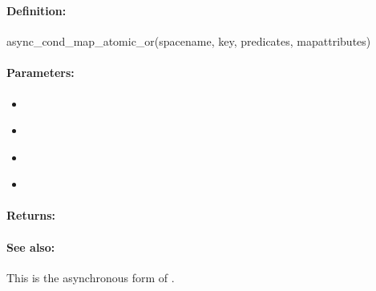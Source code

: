 \pagebreak
\subsubsection{}
\label{api:ruby:async_cond_map_atomic_or}


\paragraph{Definition:}
\begin{rubycode}
async_cond_map_atomic_or(spacename, key, predicates, mapattributes)
\end{rubycode}

\paragraph{Parameters:}
\begin{itemize}[noitemsep]
\item {}\\

\item {}\\

\item {}\\

\item {}\\

\end{itemize}

\paragraph{Returns:}


\paragraph{See also:}  This is the asynchronous form of .

\pagebreak
\subsubsection{}
\label{api:ruby:map_atomic_xor}



